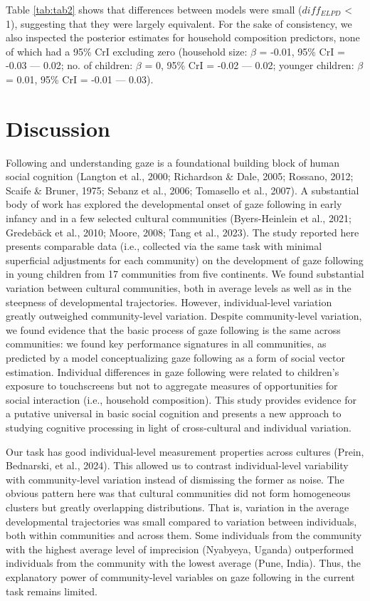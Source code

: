 \documentclass[
  man,floatsintext]{apa7}
\begin{document}
Table \ref{tab:tab2} shows that differences between models were small (\(diff_{ELPD}\) \textless{} 1), suggesting that they were largely equivalent. For the sake of consistency, we also inspected the posterior estimates for household composition predictors, none of which had a 95\% CrI excluding zero (household size: \(\beta\) = -0.01, 95\% CrI = -0.03 --- 0.02; no. of children: \(\beta\) = 0, 95\% CrI = -0.02 --- 0.02; younger children: \(\beta\) = 0.01, 95\% CrI = -0.01 --- 0.03).

\hypertarget{discussion}{%
\section{Discussion}\label{discussion}}

Following and understanding gaze is a foundational building block of human social cognition (Langton et al., 2000; Richardson \& Dale, 2005; Rossano, 2012; Scaife \& Bruner, 1975; Sebanz et al., 2006; Tomasello et al., 2007). A substantial body of work has explored the developmental onset of gaze following in early infancy and in a few selected cultural communities (Byers-Heinlein et al., 2021; Gredebäck et al., 2010; Moore, 2008; Tang et al., 2023). The study reported here presents comparable data (i.e., collected via the same task with minimal superficial adjustments for each community) on the development of gaze following in young children from 17 communities from five continents. We found substantial variation between cultural communities, both in average levels as well as in the steepness of developmental trajectories. However, individual-level variation greatly outweighed community-level variation. Despite community-level variation, we found evidence that the basic process of gaze following is the same across communities: we found key performance signatures in all communities, as predicted by a model conceptualizing gaze following as a form of social vector estimation. Individual differences in gaze following were related to children's exposure to touchscreens but not to aggregate measures of opportunities for social interaction (i.e., household composition). This study provides evidence for a putative universal in basic social cognition and presents a new approach to studying cognitive processing in light of cross-cultural and individual variation.

Our task has good individual-level measurement properties across cultures (Prein, Bednarski, et al., 2024). This allowed us to contrast individual-level variability with community-level variation instead of dismissing the former as noise. The obvious pattern here was that cultural communities did not form homogeneous clusters but greatly overlapping distributions. That is, variation in the average developmental trajectories was small compared to variation between individuals, both within communities and across them. Some individuals from the community with the highest average level of imprecision (Nyabyeya, Uganda) outperformed individuals from the community with the lowest average (Pune, India). Thus, the explanatory power of community-level variables on gaze following in the current task remains limited.
\end{document}
